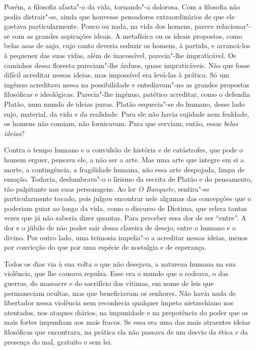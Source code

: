Porém, a filosofia afasta"-o da vida, tornando"-a dolorosa. Com a
filosofia não podia distrair"-se, ainda que houvesse pensadores
extraordinários de que ele gostava particularmente. Pouco ou nada, na
vida dos homens, parece relacionar"-se com as grandes aspirações ideais.
A metafísica ou os ideais propostos, como belas asas de anjo, cujo canto
deveria seduzir os homens, à partida, e arrancá-los à pequenez das suas
vidas, além de inacessível, parecia"-lhe impraticável. Os caminhos dessa
floresta pareciam"-lhe árduos, quase impraticáveis. Não que fosse difícil
acreditar nessas ideias, mas impossível era levá-las à prática. Só um
ingénuo acreditava nessa na possibilidade e entediavam"-no as grandes
propostas filosóficas e ideológicas. Parecia"-lhe ingénuo, patético
acreditar, como o defendia Platão, num mundo de ideias puras. Platão
esquecia"-se do humano, desse lado sujo, material, da vida e da
realidade. Para ele não havia sujidade nem fealdade, os homens não
comiam, não fornicavam. Para que serviam, então, essas \emph{belas ideias}?

Contra o tempo humano e a convulsão de história e de catástrofes, que
pode o homem erguer, pensava ele, a não ser a arte. Mas uma arte que
integre em si a morte, a contingência, a fragilidade humana, não essa
arte despojada, limpa de emoção. Todavia, deslumbrava"-o o lirismo da
escrita de Platão e do pensamento, tão palpitante nas suas personagens.
Ao ler \emph{O Banquete}, sentira"-se particularmente tocado, pois julgou
encontrar nele algumas das concepções que o poderiam guiar ao longo da
vida, como o discurso de Diotima, que relera tantas vezes que já não
saberia dizer quantas. Para perceber essa dor de ser ``entre''. A dor e
o júbilo de não poder sair dessa clareira de desejo, entre o humano e o
divino. Por outro lado, uma teimosia impelia"-o a acreditar nessas
ideias, menos por convicção do que por uma espécie de nostalgia e de
esperança.

Todos os dias via à sua volta o que não desejava, a natureza humana na
sua violência, que lhe causava repulsa. Esse era o mundo que o rodeava,
o das guerras, do massacre e do sacrifício das vítimas, em nome de leis
que permaneciam ocultas, mas que beneficiavam os senhores. Não havia
nada de libertador nessa violência nem reconhecia qualquer ímpeto
nietzschiano nos atentados, nos ataques diários, na impunidade e na
prepotência do poder que os mais fortes impunham aos mais fracos. Se
essa era uma das mais atraentes ideias filosóficas que encontrara, na
prática ela não passava de um desvio da ética e da presença do mal,
gratuito e sem lei.

